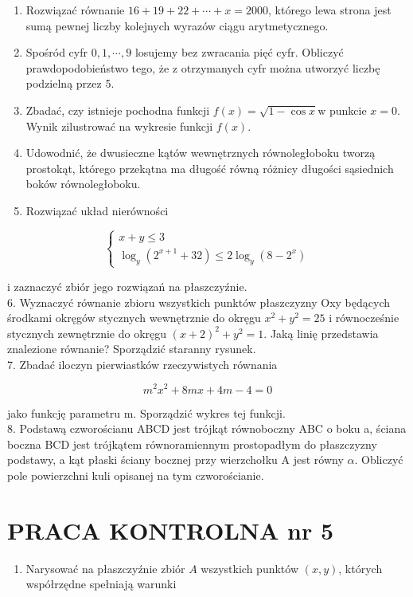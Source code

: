 \documentclass[10pt]{article}
\begin{document}
\begin{enumerate}
  \item Rozwiązać równanie $16+19+22+\cdots+x=2000$, którego lewa strona jest sumą pewnej liczby kolejnych wyrazów ciągu arytmetycznego.
  \item Spośród cyfr $0,1, \cdots, 9$ losujemy bez zwracania pięć cyfr. Obliczyć prawdopodobieństwo tego, że z otrzymanych cyfr można utworzyć liczbę podzielną przez 5.
  \item Zbadać, czy istnieje pochodna funkcji $f(x)=\sqrt{1-\cos x} \mathrm{w}$ punkcie $x=0$. Wynik zilustrować na wykresie funkcji $f(x)$.
  \item Udowodnić, że dwusieczne kątów wewnętrznych równoległoboku tworzą prostokąt, którego przekątna ma długość równą różnicy długości sąsiednich boków równoległoboku.
  \item Rozwiązać układ nierówności
\end{enumerate}

$$
\left\{\begin{array}{l}
x+y \leqslant 3 \\
\log _{y}\left(2^{x+1}+32\right) \leqslant 2 \log _{y}\left(8-2^{x}\right)
\end{array}\right.
$$

i zaznaczyć zbiór jego rozwiązań na płaszczyźnie.\\
6. Wyznaczyć równanie zbioru wszystkich punktów płaszczyzny Oxy będących środkami okręgów stycznych wewnętrznie do okręgu $x^{2}+y^{2}=25$ i równocześnie stycznych zewnętrznie do okręgu $(x+2)^{2}+y^{2}=1$. Jaką linię przedstawia znalezione równanie? Sporządzić staranny rysunek.\\
7. Zbadać iloczyn pierwiastków rzeczywistych równania

$$
m^{2} x^{2}+8 m x+4 m-4=0
$$

jako funkcję parametru m. Sporządzić wykres tej funkcji.\\
8. Podstawą czworościanu ABCD jest trójkąt równoboczny ABC o boku a, ściana boczna BCD jest trójkątem równoramiennym prostopadłym do płaszczyzny podstawy, a kąt płaski ściany bocznej przy wierzchołku A jest równy $\alpha$. Obliczyć pole powierzchni kuli opisanej na tym czworościanie.

\section*{PRACA KONTROLNA nr 5}
\begin{enumerate}
  \item Narysować na płaszczyźnie zbiór $A$ wszystkich punktów $(x, y)$, których współrzędne spełniają warunki
\end{enumerate}
\end{document}

